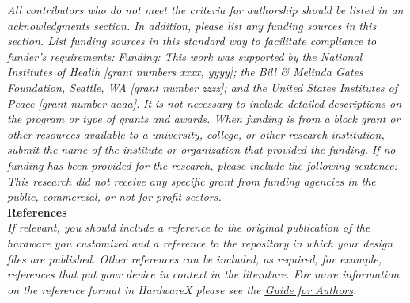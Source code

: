 \documentclass[11pt, letterpaper]{article}
\begin{document}
\noindent
\textit{All contributors who do not meet the criteria for authorship should be listed in an acknowledgments section.} 
\vskip 0.2cm
\noindent
\textit{In addition, please list any funding sources in this section. List funding sources in this standard way to facilitate compliance to funder's requirements:}
\vskip 0.2cm
\noindent
\textit{Funding: This work was supported by the National Institutes of Health [grant numbers xxxx, yyyy]; the Bill \& Melinda Gates Foundation, Seattle, WA [grant number zzzz]; and the United States Institutes of Peace [grant number aaaa].}
\vskip 0.2cm
\noindent
\textit{It is not necessary to include detailed descriptions on the program or type of grants and awards. When funding is from a block grant or other resources available to a university, college, or other research institution, submit the name of the institute or organization that provided the funding.}
\vskip 0.2cm
\noindent
\textit{If no funding has been provided for the research, please include the following sentence:}
\vskip 0.2cm
\noindent
\textit{This research did not receive any specific grant from funding agencies in the public, commercial, or not-for-profit sectors.
}\\


\noindent
\textbf{References}\\
\noindent 
\textit{If relevant, you should include a reference to the original publication of the hardware you customized and a reference to the repository in which your design files are published.  Other references can be included, as required; for example, references that put your device in context in the literature. For more information on the reference format in HardwareX please see the \href{https://www.elsevier.com/journals/hardwarex/2468-0672/guide-for-authors}{\underline{Guide for Authors}}.}
\end{document}
